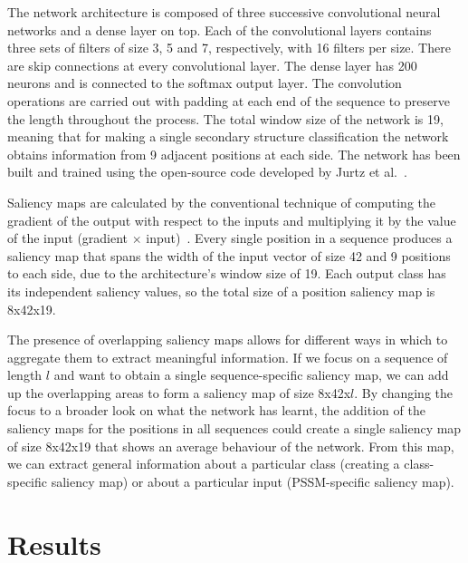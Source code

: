 \documentclass{article}
\begin{document}
The network architecture is composed of three successive convolutional neural networks and a dense layer on top. Each of the convolutional layers contains three sets of filters of size 3, 5 and 7, respectively, with 16 filters per size. There are skip connections at every convolutional layer. The dense layer has 200 neurons and is connected to the softmax output layer. The convolution operations are carried out with padding at each end of the sequence to preserve the length throughout the process. The total window size of the network is 19, meaning that for making a single secondary structure classification the network obtains information from 9 adjacent positions at each side. The network has been built and trained using the open-source code developed by Jurtz et al.~\cite{Jurtz2017}.

Saliency maps are calculated by the conventional technique of computing the gradient of the output with respect to the inputs and multiplying it by the value of the input (gradient $\times$ input)~\cite{Shrikumar2016}. Every single position in a sequence produces a saliency map that spans the width of the input vector of size 42 and 9 positions to each side, due to the architecture's window size of 19. Each output class has its independent saliency values, so the total size of a position saliency map is 8x42x19.

The presence of overlapping saliency maps allows for different ways in which to aggregate them to extract meaningful information. If we focus on a sequence of length $l$ and want to obtain a single sequence-specific saliency map, we can add up the overlapping areas to form a saliency map of size 8x42x$l$. By changing the focus to a broader look on what the network has learnt, the addition of the saliency maps for the positions in all sequences could create a single saliency map of size 8x42x19 that shows an average behaviour of the network. From this map, we can extract general information about a particular class (creating a class-specific saliency map) or about a particular input (PSSM-specific saliency map).

\section{Results}
\label{sec:results}
\end{document}
